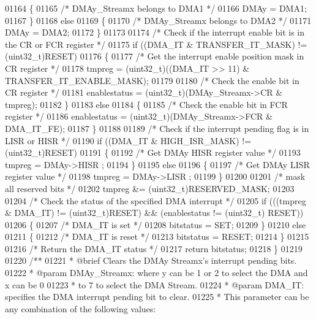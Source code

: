 \begin{DoxyCode}
01164   \{
01165     \textcolor{comment}{/* DMAy\_Streamx belongs to DMA1 */}
01166     DMAy = DMA1;
01167   \}
01168   \textcolor{keywordflow}{else}
01169   \{
01170     \textcolor{comment}{/* DMAy\_Streamx belongs to DMA2 */}
01171     DMAy = DMA2;
01172   \}
01173 
01174   \textcolor{comment}{/* Check if the interrupt enable bit is in the CR or FCR register */}
01175   \textcolor{keywordflow}{if} ((DMA\_IT & TRANSFER_IT_MASK) != (uint32\_t)RESET)
01176   \{
01177     \textcolor{comment}{/* Get the interrupt enable position mask in CR register */}
01178     tmpreg = (uint32\_t)((DMA\_IT >> 11) & TRANSFER_IT_ENABLE_MASK);
01179 
01180     \textcolor{comment}{/* Check the enable bit in CR register */}
01181     enablestatus = (uint32\_t)(DMAy\_Streamx->CR & tmpreg);
01182   \}
01183   \textcolor{keywordflow}{else}
01184   \{
01185     \textcolor{comment}{/* Check the enable bit in FCR register */}
01186     enablestatus = (uint32\_t)(DMAy\_Streamx->FCR & DMA_IT_FE);
01187   \}
01188 
01189   \textcolor{comment}{/* Check if the interrupt pending flag is in LISR or HISR */}
01190   \textcolor{keywordflow}{if} ((DMA\_IT & HIGH_ISR_MASK) != (uint32\_t)RESET)
01191   \{
01192     \textcolor{comment}{/* Get DMAy HISR register value */}
01193     tmpreg = DMAy->HISR ;
01194   \}
01195   \textcolor{keywordflow}{else}
01196   \{
01197     \textcolor{comment}{/* Get DMAy LISR register value */}
01198     tmpreg = DMAy->LISR ;
01199   \}
01200 
01201   \textcolor{comment}{/* mask all reserved bits */}
01202   tmpreg &= (uint32\_t)RESERVED_MASK;
01203 
01204   \textcolor{comment}{/* Check the status of the specified DMA interrupt */}
01205   \textcolor{keywordflow}{if} (((tmpreg & DMA\_IT) != (uint32\_t)RESET) && (enablestatus != (uint32\_t)
      RESET))
01206   \{
01207     \textcolor{comment}{/* DMA\_IT is set */}
01208     bitstatus = SET;
01209   \}
01210   \textcolor{keywordflow}{else}
01211   \{
01212     \textcolor{comment}{/* DMA\_IT is reset */}
01213     bitstatus = RESET;
01214   \}
01215 
01216   \textcolor{comment}{/* Return the DMA\_IT status */}
01217   \textcolor{keywordflow}{return}  bitstatus;
01218 \}
01219 
01220 \textcolor{comment}{/**}
01221 \textcolor{comment}{  * @brief  Clears the DMAy Streamx's interrupt pending bits.}
01222 \textcolor{comment}{  * @param  DMAy\_Streamx: where y can be 1 or 2 to select the DMA and x can be 0}
01223 \textcolor{comment}{  *          to 7 to select the DMA Stream.}
01224 \textcolor{comment}{  * @param  DMA\_IT: specifies the DMA interrupt pending bit to clear.}
01225 \textcolor{comment}{  *          This parameter can be any combination of the following values:}

\end{DoxyCode}
